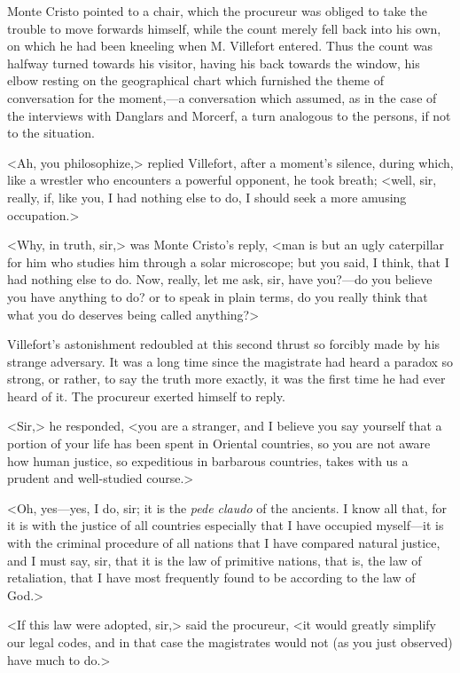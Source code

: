  Monte Cristo pointed to a chair, which the procureur was obliged to take the trouble to move forwards himself, while the count merely fell back into his own, on which he had been kneeling when M. Villefort entered. Thus the count was halfway turned towards his visitor, having his back towards the window, his elbow resting on the geographical chart which furnished the theme of conversation for the moment,—a conversation which assumed, as in the case of the interviews with Danglars and Morcerf, a turn analogous to the persons, if not to the situation. 

 <Ah, you philosophize,> replied Villefort, after a moment's silence, during which, like a wrestler who encounters a powerful opponent, he took breath; <well, sir, really, if, like you, I had nothing else to do, I should seek a more amusing occupation.> 

 <Why, in truth, sir,> was Monte Cristo's reply, <man is but an ugly caterpillar for him who studies him through a solar microscope; but you said, I think, that I had nothing else to do. Now, really, let me ask, sir, have you?—do you believe you have anything to do? or to speak in plain terms, do you really think that what you do deserves being called anything?> 

 Villefort's astonishment redoubled at this second thrust so forcibly made by his strange adversary. It was a long time since the magistrate had heard a paradox so strong, or rather, to say the truth more exactly, it was the first time he had ever heard of it. The procureur exerted himself to reply. 

 <Sir,> he responded, <you are a stranger, and I believe you say yourself that a portion of your life has been spent in Oriental countries, so you are not aware how human justice, so expeditious in barbarous countries, takes with us a prudent and well-studied course.> 

 <Oh, yes—yes, I do, sir; it is the \textit{pede claudo} of the ancients. I know all that, for it is with the justice of all countries especially that I have occupied myself—it is with the criminal procedure of all nations that I have compared natural justice, and I must say, sir, that it is the law of primitive nations, that is, the law of retaliation, that I have most frequently found to be according to the law of God.> 

 <If this law were adopted, sir,> said the procureur, <it would greatly simplify our legal codes, and in that case the magistrates would not (as you just observed) have much to do.> 

